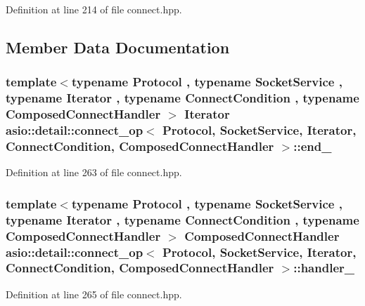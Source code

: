Definition at line 214 of file connect.\+hpp.



\subsection{Member Data Documentation}
\hypertarget{classasio_1_1detail_1_1connect__op_a54be3d73b550302179f26367a00e869c}{}
\subsubsection[{end\+\_\+}]{\setlength{\rightskip}{0pt plus 5cm}template$<$typename Protocol , typename Socket\+Service , typename Iterator , typename Connect\+Condition , typename Composed\+Connect\+Handler $>$ Iterator {\bf asio\+::detail\+::connect\+\_\+op}$<$ Protocol, Socket\+Service, Iterator, Connect\+Condition, Composed\+Connect\+Handler $>$\+::end\+\_\+}\label{classasio_1_1detail_1_1connect__op_a54be3d73b550302179f26367a00e869c}


Definition at line 263 of file connect.\+hpp.

\hypertarget{classasio_1_1detail_1_1connect__op_a8d277d2fde22cf3c2d3e8085e3e46103}{}
\subsubsection[{handler\+\_\+}]{\setlength{\rightskip}{0pt plus 5cm}template$<$typename Protocol , typename Socket\+Service , typename Iterator , typename Connect\+Condition , typename Composed\+Connect\+Handler $>$ Composed\+Connect\+Handler {\bf asio\+::detail\+::connect\+\_\+op}$<$ Protocol, Socket\+Service, Iterator, Connect\+Condition, Composed\+Connect\+Handler $>$\+::handler\+\_\+}\label{classasio_1_1detail_1_1connect__op_a8d277d2fde22cf3c2d3e8085e3e46103}


Definition at line 265 of file connect.\+hpp.

\hypertarget{classasio_1_1detail_1_1connect__op_a4a8d375fb61d65920b8e380fac9b2d1c}{}
